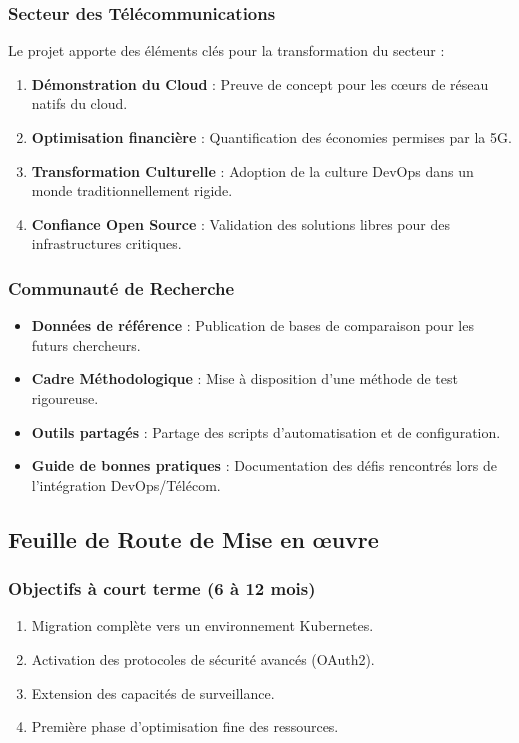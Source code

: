 \documentclass[12pt,a4paper]{report}
\begin{document}
\subsubsection{Secteur des Télécommunications}

Le projet apporte des éléments clés pour la transformation du secteur :

\begin{enumerate}
    \item \textbf{Démonstration du Cloud} : Preuve de concept pour les cœurs de réseau natifs du cloud.
    \item \textbf{Optimisation financière} : Quantification des économies permises par la 5G.
    \item \textbf{Transformation Culturelle} : Adoption de la culture DevOps dans un monde traditionnellement rigide.
    \item \textbf{Confiance Open Source} : Validation des solutions libres pour des infrastructures critiques.
\end{enumerate}

\subsubsection{Communauté de Recherche}

\begin{itemize}
    \item \textbf{Données de référence} : Publication de bases de comparaison pour les futurs chercheurs.
    \item \textbf{Cadre Méthodologique} : Mise à disposition d'une méthode de test rigoureuse.
    \item \textbf{Outils partagés} : Partage des scripts d'automatisation et de configuration.
    \item \textbf{Guide de bonnes pratiques} : Documentation des défis rencontrés lors de l'intégration DevOps/Télécom.
\end{itemize}

\subsection{Feuille de Route de Mise en œuvre}

\subsubsection{Objectifs à court terme (6 à 12 mois)}
\begin{enumerate}
    \item Migration complète vers un environnement Kubernetes.
    \item Activation des protocoles de sécurité avancés (OAuth2).
    \item Extension des capacités de surveillance.
    \item Première phase d'optimisation fine des ressources.
\end{enumerate}
\end{document}
